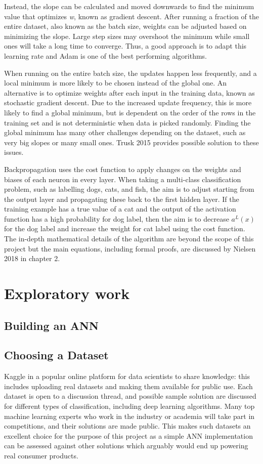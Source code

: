 \documentclass[proposal]{softeng}
\begin{document}
Instead, the slope can be calculated and moved downwards to find the minimum value that optimizes \textit{w}, known as gradient descent. After running a fraction of the entire dataset, also known as the batch size, weights can be adjusted based on minimizing the slope. Large step sizes may overshoot the minimum while small ones will take a long time to converge. Thus, a good approach is to adapt this learning rate and Adam\cite{kingma2014adam} is one of the best performing algorithms.

When running on the entire batch size, the updates happen less frequently, and a local minimum is more likely to be chosen instead of the global one. An alternative is to optimize weights after each input in the training data, known as stochastic gradient descent. Due to the increased update frequency, this is more likely to find a global minimum, but is dependent on the order of the rows in the training set and is not deterministic when data is picked randomly. Finding the global minimum has many other challenges depending on the dataset, such as very big slopes or many small ones. Trusk 2015 \cite{trask} provides possible solution to these issues.

Backpropagation uses the cost function to apply changes on the weights and biases of each neuron in every layer. When taking a multi-class classification problem, such as labelling dogs, cats, and fish, the aim is to adjust starting from the output layer and propagating these back to the first hidden layer. If the training example has a true value of a cat and the output of the activation function has a high probability for dog label, then the aim is to decrease \( a^L(x) \) for the dog label and increase the weight for cat label using the cost function. The in-depth mathematical details of the algorithm are beyond the scope of this project but the main equations, including formal proofs, are discussed by Nielsen 2018 \cite{nielsenneural} in chapter 2.

\section{Exploratory work}
\subsection{Building an ANN}
\subsection{Choosing a Dataset}
Kaggle\cite{kaggle} in a popular online platform for data scientists to share knowledge: this includes uploading real datasets and making them available for public use. Each dataset is open to a discussion thread, and possible sample solution are discussed for different types of classification, including deep learning algorithms. Many top machine learning experts who work in the industry or academia will take part in competitions, and their solutions are made public. This makes such datasets an excellent choice for the purpose of this project as a simple ANN implementation can be assessed against other solutions which arguably would end up powering real consumer products.
\end{document}
